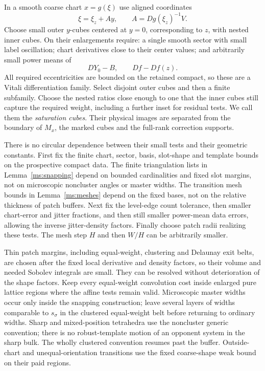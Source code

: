 In a smooth coarse chart $x=g(\xi)$ use aligned coordinates
\[
 \xi=\xi_z+A y,\qquad A=Dg(\xi_z)^{-1}V.
\]
Choose small outer $y$-cubes centered at $y=0$, corresponding to $z$,
with nested inner cubes.
On their enlargements require: a single smooth sector with small
label oscillation; chart derivatives close to their center values;
and arbitrarily small power means of
\[
                         DY_0-B,\qquad Df-Df(z).
\]
All required eccentricities are bounded on the retained compact, so
these are a Vitali differentiation family.  Select disjoint outer
cubes and then a finite subfamily.  Choose the nested ratios close
enough to one that the inner cubes still capture the required weight,
including a further inset for residual tests.  We call them the
\emph{saturation cubes}.  Their physical images are separated from the
boundary of $M_x$, the marked cubes and the full-rank correction
supports.

There is no circular dependence between their small tests and their
geometric constants.  First fix the finite chart, sector, basis,
slot-shape and template bounds on the prospective compact data.
The finite triangulation lists in Lemma~\ref{ms:snapping}
depend on bounded cardinalities and fixed slot margins, not on
microscopic noncluster angles or master widths.  The transition mesh
bounds in Lemma~\ref{ms:meshes} depend on the fixed bases, not on the
relative thickness of patch buffers.  Next fix the level-edge
count tolerance, then smaller chart-error and jitter fractions,
and then still smaller power-mean data errors, allowing the inverse
jitter-density factors.  Finally choose patch radii realizing these
tests.  The mesh step $H$ and then $W/H$ can be arbitrarily smaller.

Thin patch margins, including equal-weight, clustering and Delaunay
exit belts, are chosen after the fixed local derivative and density
factors, so their volume and needed Sobolev integrals are small.
They can be resolved without deterioration of the shape factors.
Keep every equal-weight convolution cost inside enlarged pure lattice
regions where the affine tests remain valid.  Microscopic master
widths occur only inside the snapping construction; leave several
layers of widths comparable to $s_\sigma$ in the clustered
equal-weight belt before returning to ordinary widths.  Sharp and
mixed-position tetrahedra use the noncluster generic convention;
there is no robust-template motion of an opponent system in the
sharp bulk.  The wholly clustered convention resumes past the
buffer.  Outside-chart and unequal-orientation transitions use the
fixed coarse-shape weak bound on their paid regions.

